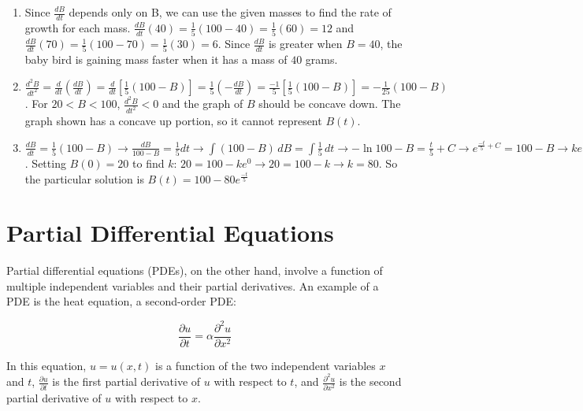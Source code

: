 \begin{Answer}[ref = diffeq2]
\begin{enumerate}
\item Since $\frac{dB}{dt}$ depends only on B, we can use the given masses to 
find the rate of growth for each mass. $\frac{dB}{dt}(40) = \frac{1}{5} \left( 
100 - 40 \right) = \frac{1}{5} \left(60 \right) = 12$ and $\frac{dB}{dt}(70) = 
\frac{1}{5} \left( 100 - 70 \right) = \frac{1}{5} \left( 30 \right) = 6$. 
Since $\frac{dB}{dt}$ is greater when $B = 40$, the baby bird is gaining mass 
faster when it has a mass of $40$ grams. 
\item $\frac{d^2 B}{dt^2} = \frac{d}{dt} \left( \frac{dB}{dt} \right) = 
\frac{d}{dt} \left[ \frac{1}{5} \left(100 - B \right) \right] = \frac{1}{5} 
\left( -\frac{dB}{dt} \right) = \frac{-1}{5} \left[\frac{1}{5} \left( 100 - B 
\right) \right] = -\frac{1}{25} \left(100 - B \right)$. For $20 < B < 100$, 
$\frac{d^2 B}{dt^2} < 0$ and the graph of $B$ should be concave down. The 
graph shown has a concave up portion, so it cannot represent $B(t)$. 
\item $\frac{dB}{dt} = \frac{1}{5} \left( 100 - B \right) \rightarrow 
\frac{dB}{100 - B} = \frac{1}{5} dt \rightarrow \int \left(100 - B \right)\,dB 
= \int \frac{1}{5}\,dt \rightarrow -\ln{100 - B} = \frac{t}{5} + C \rightarrow 
e^{\frac{-t}{5} + C} = 100 - B \rightarrow ke^{\frac{-t}{5}} = 100 - B 
\rightarrow B(t) = 100 - ke^{\frac{-t}{5}}$. Setting $B(0) = 20$ to find $k$: 
$20 = 100 - ke^{0} \rightarrow 20 = 100 - k \rightarrow k = 80$. So the 
particular solution is $B(t) = 100 - 80e^{\frac{-t}{5}}$
\end{enumerate}
\end{Answer}

\section{Partial Differential Equations}

Partial differential equations (PDEs), on the other hand, involve a
function of multiple independent variables and their partial
derivatives. An example of a PDE is the heat equation, a second-order
PDE: 

\begin{equation}
\frac{\partial u}{\partial t} = \alpha \frac{\partial^2 u}{\partial x^2}
\end{equation}

In this equation, $u = u(x, t)$ is a function of the two independent
variables $x$ and $t$, $\frac{\partial u}{\partial t}$ is the first
partial derivative of $u$ with respect to $t$, and $\frac{\partial^2
  u}{\partial x^2}$ is the second partial derivative of $u$ with
respect to $x$.



